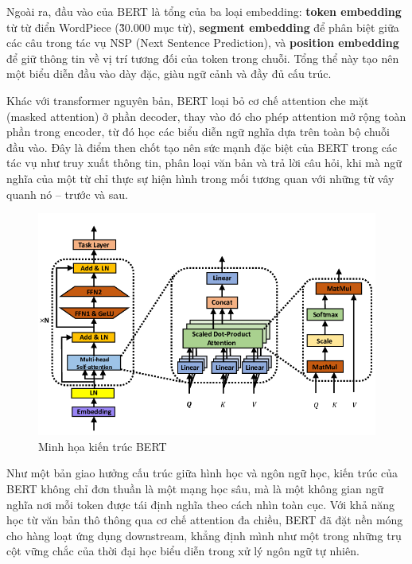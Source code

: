 Ngoài ra, đầu vào của BERT là tổng của ba loại embedding: \textbf{token embedding} từ từ điển WordPiece (\~30.000 mục từ), \textbf{segment embedding} để phân biệt giữa các câu trong tác vụ NSP (Next Sentence Prediction), và \textbf{position embedding} để giữ thông tin về vị trí tương đối của token trong chuỗi. Tổng thể này tạo nên một biểu diễn đầu vào dày đặc, giàu ngữ cảnh và đầy đủ cấu trúc.

Khác với transformer nguyên bản, BERT loại bỏ cơ chế attention che mặt (masked attention) ở phần decoder, thay vào đó cho phép attention mở rộng toàn phần trong encoder, từ đó học các biểu diễn ngữ nghĩa dựa trên toàn bộ chuỗi đầu vào. Đây là điểm then chốt tạo nên sức mạnh đặc biệt của BERT trong các tác vụ như truy xuất thông tin, phân loại văn bản và trả lời câu hỏi, khi mà ngữ nghĩa của một từ chỉ thực sự hiện hình trong mối tương quan với những từ vây quanh nó -- trước và sau.

\begin{figure}[H]
    \caption{Minh họa kiến trúc BERT}
    \includegraphics[width=\linewidth]{assets/bert.png}
\end{figure}

Như một bản giao hưởng cấu trúc giữa hình học và ngôn ngữ học, kiến trúc của BERT không chỉ đơn thuần là một mạng học sâu, mà là một không gian ngữ nghĩa nơi mỗi token được tái định nghĩa theo cách nhìn toàn cục. Với khả năng học từ văn bản thô thông qua cơ chế attention đa chiều, BERT đã đặt nền móng cho hàng loạt ứng dụng downstream, khẳng định mình như một trong những trụ cột vững chắc của thời đại học biểu diễn trong xử lý ngôn ngữ tự nhiên.
